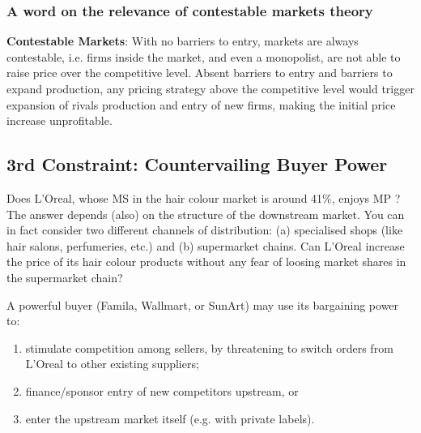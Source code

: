         \subsubsection{A word on the relevance of contestable markets theory}

        \textbf{Contestable Markets}: With no barriers to entry, markets are always contestable, i.e. firms inside the market, and even a monopolist, are not able to raise price over the competitive level. Absent barriers to entry and barriers to expand production, any pricing strategy above the competitive level would trigger expansion of rivals production and entry of new firms, making the initial price increase unprofitable.


\newpage
    \subsection{3rd Constraint: Countervailing Buyer Power}


        Does L’Oreal, whose MS in the hair colour market is around 41\%, enjoys MP ? The answer depends (also) on the structure of the downstream market. You can in fact consider two different channels of distribution: (a) specialised shops (like hair salons, perfumeries, etc.) and (b) supermarket chains. Can L’Oreal increase the price of its hair colour products without any fear of loosing market shares in the supermarket chain?

        A powerful buyer (Famila, Wallmart, or SunArt) may use its bargaining power to: 
        \begin{enumerate}
            \item stimulate competition among sellers, by threatening to switch orders from L’Oreal to other existing suppliers;
            \item finance/sponsor entry of new competitors upstream, or 
            \item enter the upstream market itself (e.g. with private labels). 
        \end{enumerate}

